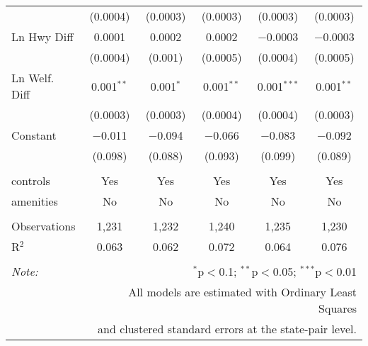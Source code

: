 \begin{table}[!htbp]
\begin{tabular}{@{\extracolsep{5pt}}lccccc}
  & (0.0004) & (0.0003) & (0.0003) & (0.0003) & (0.0003) \\ 
  Ln Hwy Diff & 0.0001 & 0.0002 & 0.0002 & $-$0.0003 & $-$0.0003 \\ 
  & (0.0004) & (0.001) & (0.0005) & (0.0004) & (0.0005) \\ 
  Ln Welf. Diff & 0.001$^{**}$ & 0.001$^{*}$ & 0.001$^{**}$ & 0.001$^{***}$ & 0.001$^{**}$ \\ 
  & (0.0003) & (0.0003) & (0.0004) & (0.0004) & (0.0003) \\ 
  Constant & $-$0.011 & $-$0.094 & $-$0.066 & $-$0.083 & $-$0.092 \\ 
  & (0.098) & (0.088) & (0.093) & (0.099) & (0.089) \\ 
 \hline \\[-1.8ex] 
controls & Yes & Yes & Yes & Yes & Yes \\ 
amenities & No & No & No & No & No \\ 
\hline \\[-1.8ex] 
Observations & 1,231 & 1,232 & 1,240 & 1,235 & 1,230 \\ 
R$^{2}$ & 0.063 & 0.062 & 0.072 & 0.064 & 0.076 \\ 
\hline 
\hline \\[-1.8ex] 
\textit{Note:}  & \multicolumn{5}{r}{$^{*}$p$<$0.1; $^{**}$p$<$0.05; $^{***}$p$<$0.01} \\ 
 & \multicolumn{5}{r}{All models are estimated with Ordinary Least Squares} \\ 
 & \multicolumn{5}{r}{and clustered standard errors at the state-pair level.} \\ 
\end{tabular} 
\end{table} 
